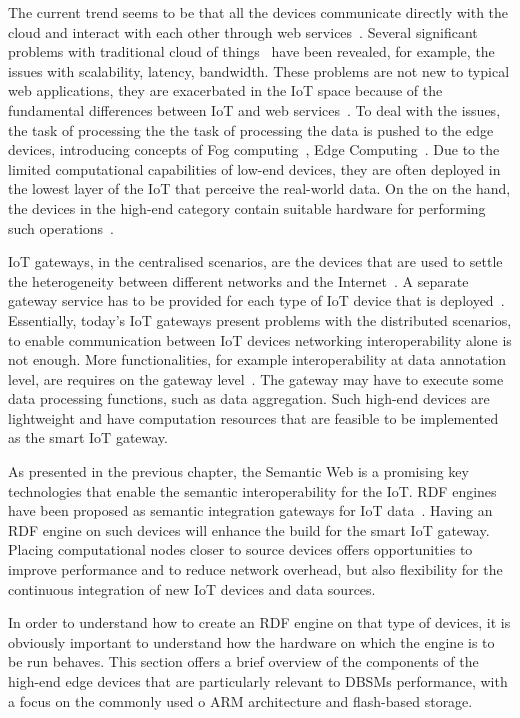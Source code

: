 The current trend seems to be that all the devices communicate directly with the cloud and interact with each other through web services~\citep{E.A.Lee:2014}. 
Several significant problems with traditional cloud of things~\citep{Parwekar:2011} have been revealed, for example, the issues with scalability, latency, bandwidth. 
These problems are not new to typical web applications, they are exacerbated in the IoT space because of the fundamental differences between IoT and web services~\citep{Zhang:2015}.
To deal with the issues, the task of processing the the task of processing the data is pushed to the edge devices, introducing concepts of Fog computing~\citep{Bonomi:2012}, Edge Computing~\citep{Salman:2015}.
Due to the limited computational capabilities of low-end devices, they are often deployed in the lowest layer of the IoT that perceive the real-world data.
On the on the hand, the devices in the high-end category contain suitable hardware for performing such operations~\citep{Kruger:2014, Morabito:2017}.

IoT gateways, in the centralised scenarios, are the devices that are used to settle the heterogeneity between different networks and the Internet~\citep{Zhu:2010, Petrolo:2017}.
A separate gateway service has to be provided for each type of IoT device that is deployed~\citep{Zachariah:2015}.
Essentially, today's IoT gateways present problems with the distributed scenarios, to enable communication between IoT devices networking interoperability alone is not enough.
More functionalities, for example interoperability at data annotation level, are requires on the gateway level~\citep{Desai:2015}.
The gateway may have to execute some data processing functions, such as data aggregation.
Such high-end devices are lightweight and have computation resources that are feasible to be implemented as the smart IoT gateway.

As presented in the previous chapter, the Semantic Web is a promising key technologies that enable the semantic interoperability for the IoT.
RDF engines have been proposed as semantic integration gateways for IoT data~\citep{Kiljander:2014}.
Having an RDF engine on such devices will enhance the build for the smart IoT gateway.
Placing computational nodes closer to source devices offers opportunities to improve performance and to reduce network overhead, but also flexibility for the continuous integration of new IoT devices and data sources. 

In order to understand how to create an RDF engine on that type of devices, it is obviously important to understand how the hardware on which the engine is to be run behaves.
This section offers a brief overview of the components of the high-end edge devices that are particularly relevant to DBSMs performance, with a focus on the commonly used o ARM architecture and flash-based storage.

